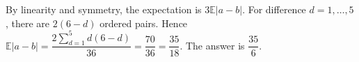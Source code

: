 By linearity and symmetry, the expectation is $3\mathbb E|a-b|$. For difference $d=1,\ldots,5$, there are $2(6-d)$ ordered pairs. Hence $\mathbb E|a-b|=\dfrac{2\sum_{d=1}^5d(6-d)}{36}=\dfrac{70}{36}=\dfrac{35}{18}$. The answer is $\boxed{\dfrac{35}{6}}$.
